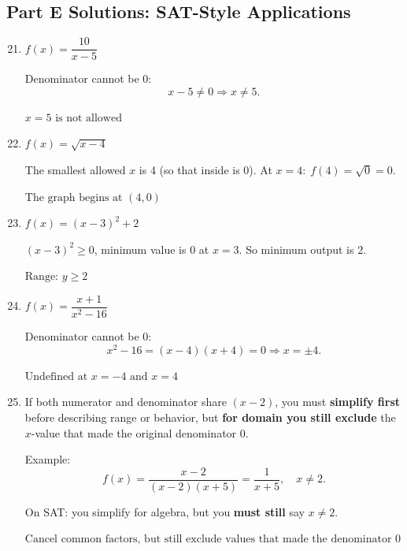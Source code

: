 \documentclass[14pt]{extarticle}
\renewcommand{\emph}[1]{\textbf{#1}}
\begin{document}
\subsection*{Part E Solutions: SAT-Style Applications}
\begin{enumerate}
  \setcounter{enumi}{20}
  \item \(f(x) = \dfrac{10}{x - 5}\)

  Denominator cannot be 0:
  \[
  x - 5 \ne 0 \Rightarrow x \ne 5.
  \]

  \(\boxed{x = 5 \text{ is not allowed}}\)

  \item \(f(x) = \sqrt{x - 4}\)

  The smallest allowed \(x\) is 4 (so that inside is 0).  
  At \(x = 4:\; f(4) = \sqrt{0} = 0.\)

  \(\boxed{\text{The graph begins at } (4,0)}\)

  \item \(f(x) = (x - 3)^2 + 2\)

  \((x - 3)^2 \ge 0\), minimum value is 0 at \(x = 3\).  
  So minimum output is 2.

  \(\boxed{\text{Range: } y \ge 2}\)

  \item \(f(x) = \dfrac{x + 1}{x^2 - 16}\)

  Denominator cannot be 0:
  \[
  x^2 - 16 = (x - 4)(x + 4) = 0
  \Rightarrow x = \pm 4.
  \]

  \(\boxed{\text{Undefined at } x = -4 \text{ and } x = 4}\)

  \item If both numerator and denominator share \((x - 2)\), you must \textbf{simplify first} before describing range or behavior, but \textbf{for domain you still exclude} the \(x\)-value that made the original denominator 0.

  Example:
  \[
  f(x) = \frac{x - 2}{(x - 2)(x + 5)} = \frac{1}{x + 5}, \quad x \ne 2.
  \]

  On SAT: you simplify for algebra, but you \emph{must still} say \(x \ne 2\).

  \(\boxed{\text{Cancel common factors, but still exclude values that made the denominator 0 originally}}\)
\end{enumerate}





\end{document}
